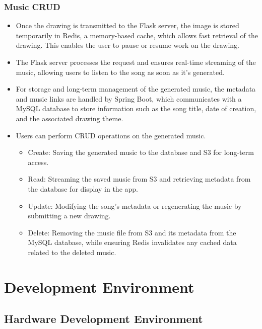 \documentclass[conference]{IEEEtran}
\begin{document}
\subsubsection{Music CRUD}
\begin{itemize}
    \item Once the drawing is transmitted to the Flask server, the image is stored temporarily in Redis, a memory-based cache, which allows fast retrieval of the drawing. This enables the user to pause or resume work on the drawing.\\
    \item The Flask server processes the request and ensures real-time streaming of the music, allowing users to listen to the song as soon as it's generated.\\
    \item For storage and long-term management of the generated music, the metadata and music links are handled by Spring Boot, which communicates with a MySQL database to store information such as the song title, date of creation, and the associated drawing theme.\\
    \item Users can perform CRUD operations on the generated music.
\begin{itemize}
    \item Create: Saving the generated music to the database and S3 for long-term access.\\
    \item Read: Streaming the saved music from S3 and retrieving metadata from the database for display in the app.\\
    \item Update: Modifying the song’s metadata or regenerating the music by submitting a new drawing.\\
    \item Delete: Removing the music file from S3 and its metadata from the MySQL database, while ensuring Redis invalidates any cached data related to the deleted music.\\
\end{itemize}
\end{itemize}



\section{Development Environment}

\subsection{Hardware Development Environment}
\end{document}
